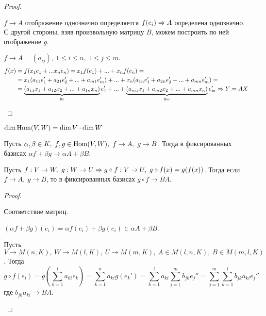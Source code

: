 \begin{proof}
	\begin{MyList}
		\item $f \to A$ отображение однозначно определяется $f(e_i) \Rightarrow A$ определена однозначно.
		С другой стороны, взяв произвольную матрицу $B$, можем построить по ней отображение $g$.

		\item $f \to A = (a_{ij}), \ 1 \leqslant i \leqslant n, \ 1 \leqslant j \leqslant m$.
		\begin{align*}
			f(x) &= f(x_1 e_1 + ... x_n e_n) = x_1 f(e_1) + ... + x_n f(e_n) = \\
			&= x_1 (a_{11} e_1' + a_{21} e_2' + ... + a_{m1} e_m') + ... + x_n (a_{1n} e_1' + a_{2n} e_2' + ... + a_{mn} e_m') = \\
			&= \underbrace{(a_{11} x_1 + a_{12} x_2 + ... + a_{1n} x_n)}_{y_1} e_1' + ... + \underbrace{(a_{m1} x_1 + a_{m2} x_2 + ... + a_{mn} x_n)}_{y_m} e_m' \Rightarrow Y = AX
		\end{align*}
	\end{MyList}
\end{proof}

\begin{Cons}
	\begin{MyList}
		\item $\dim \operatorname{Hom}(V, W) = \dim V \cdot \dim W$
		\item Пусть $\alpha, \beta \in K, \ f, g \in \operatorname{Hom}(V, W), \ f \to A, \ g \to B$. Тогда в фиксированных базисах $\alpha f + \beta g \to \alpha A + \beta B$.
		\item Пусть $f : V \to W, \ g : W \to U \Rightarrow g \circ f : V \to U, \ g \circ f(x) = g(f(x))$.
		Тогда если $f \to A, \ g \to B$, то в фиксированных базисах $g \circ f \to BA$.
	\end{MyList}
\end{Cons}

\gdef\AuthorName{Дарья Гольденберг}

\begin{proof}
	\begin{MyList}
		\item Соответствие матриц.
		\item $(\alpha f  + \beta g) (e_i) = \alpha f (e_i) + \beta g (e_i) \in \alpha A + \beta B$.
		\item Пусть $ V \to M(n, K), \ W \to M(l, K),\ U \to M(m, K), \ A \in M(l, n, K), \ B \in M(m, l, K)$. Тогда
		\[g \circ f (e_i) = g \left(\sum_{k=1}^l a_{ki}e_k\right) = \sum_{k=1}^n a_{ki} g(e_k') = \sum_{k=1}^l a_{ki} \sum_{j =1}^m b_{jk} e_j'' = \sum_{j = 1}^m \sum_{k = 1}^l b_{jk} a_{ki} e_j''\]
		где $b_{jk} a_{ki} \to BA$.
	\end{MyList}
\end{proof}

